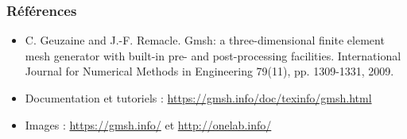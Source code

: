 \documentclass[aspectratio=169]{beamer}
\begin{document}
\begin{frame}[fragile]
\frametitle{}
\begin{minipage}[t]{1.1\linewidth}
  \hspace{-1cm}
\end{minipage}

\end{frame}

\begin{frame}[fragile]
\frametitle{Références}
\begin{itemize}
  \item C. Geuzaine and J.-F. Remacle. Gmsh: a three-dimensional finite element mesh generator with built-in pre- and post-processing facilities. International Journal for Numerical Methods in Engineering 79(11), pp. 1309-1331, 2009.
  \item Documentation et tutoriels : \url{https://gmsh.info/doc/texinfo/gmsh.html}
  \item Images : \url{https://gmsh.info/} et \url{http://onelab.info/}
\end{itemize}

\end{frame}
\end{document}
